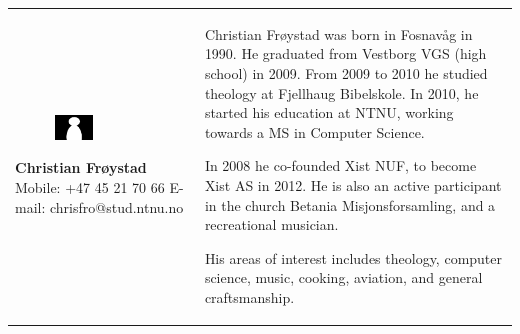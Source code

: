 \documentclass[11pt]{book}
\begin{document}
\begin{table}[H]
\centering
\begin{tabular}{ p{7cm} p{7cm} }
\parbox{7cm}{
\begin{figure}[H]
      \includegraphics[width=0.4\textwidth]{Figures/Person.png}
      \label{fig:partners_group_christian}
\end{figure}
\textbf{Christian Frøystad}\\
Mobile: +47 45 21 70 66\\
E-mail: chrisfro@stud.ntnu.no} & \parbox{7cm}{
Christian Frøystad was born in Fosnavåg in 1990. He graduated from Vestborg VGS (high school) in 2009. From 2009 to 2010 he studied theology at Fjellhaug Bibelskole.
In 2010, he started his education at NTNU, working towards a MS in Computer Science.

In 2008 he co-founded Xist NUF, to become Xist AS in 2012.
He is also an active participant in the church Betania Misjonsforsamling, and a recreational musician.

His areas of interest includes theology, computer science, music, cooking, aviation, and general craftsmanship.
}
\end{tabular}
\label{tab:partners_group_christian}
\end{table}
\end{document}
